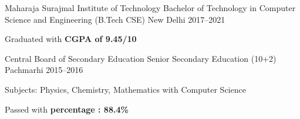 

\begin{cventries}

  \cventry
    {Maharaja Surajmal Institute of Technology} %
    {Bachelor of Technology in Computer Science and Engineering (B.Tech CSE)} %
    {New Delhi} %
    {2017--2021} %
    {
      \begin{cvitems} %
        \item {Graduated with \textbf{CGPA of 9.45/10}}
      \end{cvitems}
    }
    {}

  \cventry
    {Central Board of Secondary Education} %
    {Senior Secondary Education (10+2)} %
    {Pachmarhi} %
    {2015--2016} %
    {
      \begin{cvitems} %
        \item {Subjects: Physics, Chemistry, Mathematics with Computer Science}
        \item {Passed with \textbf{percentage : 88.4\%}}
      \end{cvitems}
    }
    {}


\end{cventries}
